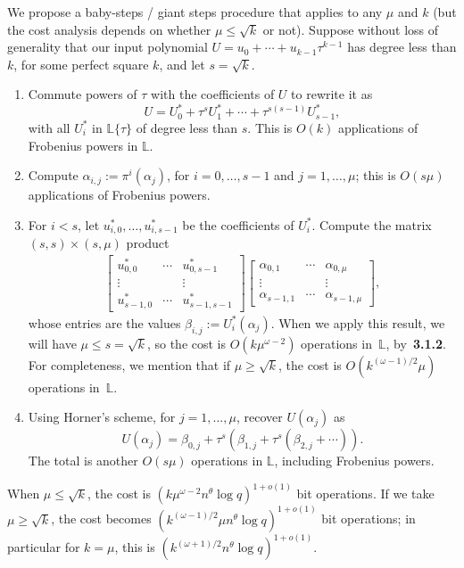 \documentclass[sigconf]{acmart}
\renewcommand{\L}{\mathbb{L}}
\newcommand{\ang}[1]{\{#1\}}
\begin{document}
We propose a baby-steps / giant steps procedure that applies
to any $\mu$ and $k$ (but the cost analysis depends on whether
$\mu \le \sqrt{k}$ or not). Suppose without loss of
generality that our input polynomial $U = u_0 + \cdots +
u_{k-1}\tau^{k-1}$ has degree less than $k$, for some perfect square
$k$, and let $s=\sqrt{k}$.
\begin{enumerate}
\item Commute powers of $\tau$ with the coefficients of $U$ to rewrite it as 
$$U = U^*_{0} + \tau^s U^*_{1} + \cdots + \tau^{s(s-1)} U^*_{s-1},$$
  with all $U^*_i$ in $\L\ang{\tau}$ of degree less than $s$.
This is $O(k)$  applications of Frobenius powers in $\L$.
\item Compute $\alpha_{i,j}:=\pi^i(\alpha_j)$, for
  $i=0,\dots,s-1$ and $j=1,\dots,\mu$; this is $O(s \mu)$
applications of Frobenius powers.
\item For $i< s$, let $u^*_{i,0},\dots,u^*_{i,s-1}$ be 
the coefficients of $U^*_i$. Compute the matrix 
$(s,s) \times (s,\mu)$ product
\begin{align*}
\left [ \begin{matrix}
u^*_{0,0} & \cdots & u^*_{0,s-1} \\
\vdots && \vdots \\
u^*_{s-1,0} & \cdots & u^*_{s-1,s-1} 
  \end{matrix} \right ]
\left [ \begin{matrix}
\alpha_{0,1} & \cdots & \alpha_{0,\mu} \\
\vdots && \vdots \\
\alpha_{s-1,1} & \cdots & \alpha_{s-1,\mu} 
  \end{matrix} \right ],
\end{align*}
whose entries are the values $\beta_{i,j}:=U^*_{i}(\alpha_j)$.  When
we apply this result, we will have $\mu \le s = \sqrt{k}$, so the cost is $O(k
\mu^{\omega-2})$ operations in~$\L$, by~{\bf 3.1.2}. For completeness,
we mention that if $\mu \ge \sqrt{k}$, the cost is
$O(k^{(\omega-1)/2} \mu)$  operations in~$\L$.

\item Using Horner's scheme, for $j=1,\dots,\mu$, recover $U(\alpha_j)$ as 
$$U(\alpha_j) = \beta_{0,j} + \tau^s( \beta_{1,j} + \tau^s(\beta_{2,j}
  + \cdots )).$$ The total is another $O(s \mu)$ operations
in $\L$, including Frobenius powers.
\end{enumerate}
When $\mu \le \sqrt{k}$, the cost is $(k \mu^{\omega-2}
n^\theta \log q)^{1+ o(1)}$ bit operations. If we take $\mu\ge
\sqrt{k}$, the cost  becomes $(k^{(\omega-1)/2} \mu n^\theta \log
q)^{1+ o(1)}$ bit operations; in particular for $k=\mu$, this is
$(k^{(\omega+1)/2} n^\theta \log q)^{1+ o(1)}$.
\end{document}

